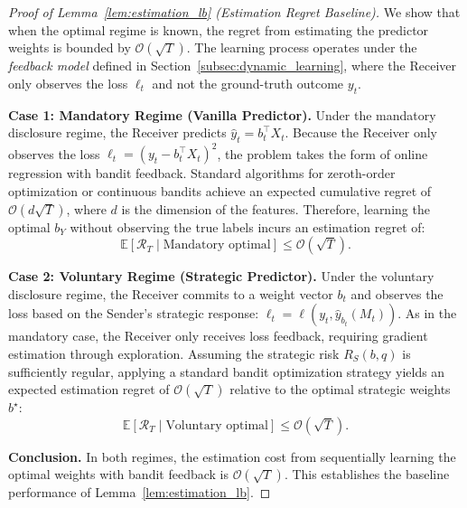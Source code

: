 \begin{proof}[Proof of Lemma~\ref{lem:estimation_lb} (Estimation Regret Baseline)]
We show that when the optimal regime is known, the regret from estimating the predictor weights is bounded by $\mathcal{O}(\sqrt{T})$. The learning process operates under the \emph{feedback model} defined in Section~\ref{subsec:dynamic_learning}, where the Receiver only observes the loss $\ell_t$ and not the ground-truth outcome $y_t$.

\textbf{Case 1: Mandatory Regime (Vanilla Predictor).}
Under the mandatory disclosure regime, the Receiver predicts $\hat{y}_t = b_t^\top X_t$. Because the Receiver only observes the loss $\ell_t = (y_t - b_t^\top X_t)^2$, the problem takes the form of online regression with bandit feedback. Standard algorithms for zeroth-order optimization or continuous bandits achieve an expected cumulative regret of $\mathcal{O}(d\sqrt{T})$, where $d$ is the dimension of the features. Therefore, learning the optimal $b_Y$ without observing the true labels incurs an estimation regret of:
\begin{equation*}
    \mathbb{E}[\mathcal{R}_T \mid \text{Mandatory optimal}] \le \mathcal{O}(\sqrt{T}).
\end{equation*}

\textbf{Case 2: Voluntary Regime (Strategic Predictor).}
Under the voluntary disclosure regime, the Receiver commits to a weight vector $b_t$ and observes the loss based on the Sender's strategic response: $\ell_t = \ell(y_t, \hat{y}_{b_t}(M_t))$. As in the mandatory case, the Receiver only receives loss feedback, requiring gradient estimation through exploration. Assuming the strategic risk $R_S(b, q)$ is sufficiently regular, applying a standard bandit optimization strategy yields an expected estimation regret of $\mathcal{O}(\sqrt{T})$ relative to the optimal strategic weights $b^\star$:
\begin{equation*}
    \mathbb{E}[\mathcal{R}_T \mid \text{Voluntary optimal}] \le \mathcal{O}(\sqrt{T}).
\end{equation*}

\textbf{Conclusion.}
In both regimes, the estimation cost from sequentially learning the optimal weights with bandit feedback is $\mathcal{O}(\sqrt{T})$. This establishes the baseline performance of Lemma~\ref{lem:estimation_lb}.
\end{proof}

